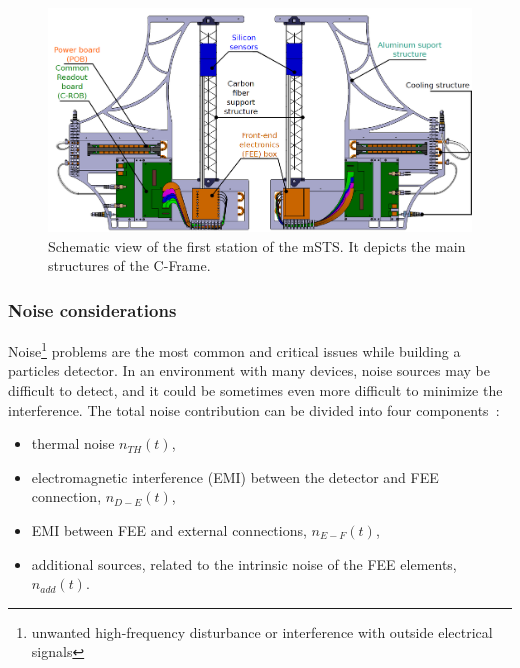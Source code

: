 \begin{figure}[!h]
\centering
\includegraphics[width=0.9\columnwidth]{Chapter6/DCS/images/unit0.png}
\caption{Schematic view of the first station of the \gls{mSTS}. It depicts the main structures of the C-Frame. }
\label{fig_msts_scheme}
\end{figure}
\newpage


\subsubsection{Noise considerations}
Noise\footnote{unwanted high-frequency disturbance or interference with outside electrical signals} problems are the most common and critical issues while building a particles detector. In an environment with many devices, noise sources may be difficult to detect, and it could be sometimes even more difficult to minimize the interference. The total noise contribution can be divided into four components~\cite{noise_twepp2008}:
\begin{itemize}
    \item thermal noise $n_{TH}(t)$,
    \item electromagnetic interference (\gls{EMI}) between the detector and \gls{FEE} connection, $n_{D-E}(t)$,
    \item \gls{EMI} between \gls{FEE} and external connections, $n_{E-F}(t)$,
    \item additional sources, related to the intrinsic noise of the FEE elements, $n_{add}(t)$.
\end{itemize}

